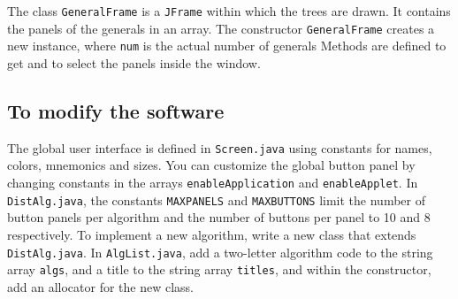 \documentclass[11pt]{article}
\newcommand{\p}[1]{\texttt{#1}}
\begin{document}
The class \p{GeneralFrame} is a \p{JFrame} within which the trees are drawn.
It contains the panels of the generals in an array.
The constructor \p{GeneralFrame} creates a new
instance, where \p{num} is the actual number of generals
Methods are defined to get and to select the panels
inside the window.

\subsection{To modify the software}

The global user interface is defined in \p{Screen.java} using
constants for names, colors, mnemonics and sizes. You can
customize the global button panel by changing constants in
the arrays \p{enableApplication} and \p{enableApplet}.
In \p{DistAlg.java}, the constants \p{MAXPANELS} and \p{MAXBUTTONS} limit the
number of button panels per algorithm and the number of buttons
per panel to 10 and 8 respectively.
To implement a new algorithm,
write a new class that extends \p{DistAlg.java}. In
\p{AlgList.java}, add a two-letter algorithm code to the string
array \p{algs}, and a title to the string array \p{titles}, and
within the constructor, add an allocator for the new class.
\end{document}
